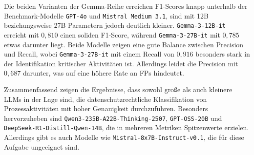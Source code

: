 Die beiden Varianten der Gemma-Reihe erreichen F1-Scores knapp unterhalb der Benchmark-Modelle \texttt{GPT-4o} und \texttt{Mistral Medium 3.1}, sind mit 12B beziehungsweise 27B Parametern jedoch deutlich kleiner. \texttt{Gemma-3-12B-it} erreicht mit $0{,}810$ einen soliden F1-Score, während \texttt{Gemma-3-27B-it} mit $0{,}785$ etwas darunter liegt. Beide Modelle zeigen eine gute Balance zwischen Precision und Recall, wobei \texttt{Gemma-3-27B-it} mit einem Recall von $0{,}916$ besonders stark in der Identifikation kritischer Aktivitäten ist. Allerdings leidet die Precision mit $0{,}687$ darunter, was auf eine höhere Rate an \acp{FP} hindeutet.

Zusammenfassend zeigen die Ergebnisse, dass sowohl große als auch kleinere \acp{LLM} in der Lage sind, die datenschutzrechtliche Klassifikation von Prozessaktivitäten mit hoher Genauigkeit durchzuführen. Besonders hervorzuheben sind \texttt{Qwen3-235B-A22B-Thinking-2507}, \texttt{GPT-OSS-20B} und \texttt{DeepSeek-R1-Distill-Qwen-14B}, die in mehreren Metriken Spitzenwerte erzielen. Allerdings gibt es auch Modelle wie \texttt{Mistral-8x7B-Instruct-v0.1}, die für diese Aufgabe ungeeignet sind.
